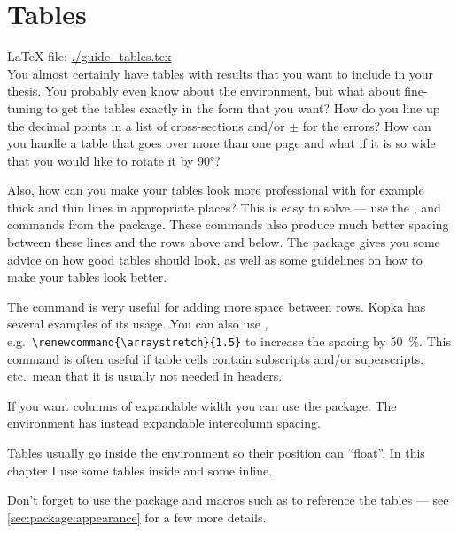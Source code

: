 
\chapter{Tables}%
\label{sec:table}

\LaTeX{} file: \url{./guide_tables.tex}\\[1ex]
\noindent
You almost certainly have tables with results that you want to include
in your thesis. You probably even know about the 
environment, but what about fine-tuning to get the tables exactly in
the form that you want? How do you line up the decimal points in a
list of cross-sections and/or \(\pm\) for the errors? How can you
handle a table that goes over more than one page and what if it is so
wide that you would like to rotate it by \ang{90}?

Also, how can you make your tables look more professional with for
example thick and thin lines in appropriate places? This is easy to
solve --- use the ,  and 
commands from the  package. These commands also
produce much better spacing between these lines and the rows above and
below. The  package gives you some advice on how
good tables should look, as well as some guidelines on how to make your
tables look better.

The  command is very useful for adding more space between
rows. Kopka has several examples of its usage. You can also use
, e.g.\ \verb+\renewcommand{\arraystretch}{1.5}+ to
increase the spacing by \SI{50}{\percent}. This command is often useful if table
cells contain subscripts and/or superscripts. 
etc.\ mean that it is usually not needed in headers.

If you want columns of expandable width you can use the
 package. The environment  has instead
expandable intercolumn spacing.

Tables usually go inside the  environment so their position
can \enquote{float}. In this chapter I use some tables inside 
and some inline.

Don't forget to use the package  and macros such as 
to reference the tables --- see \cref{sec:package:appearance} for a few more details.

